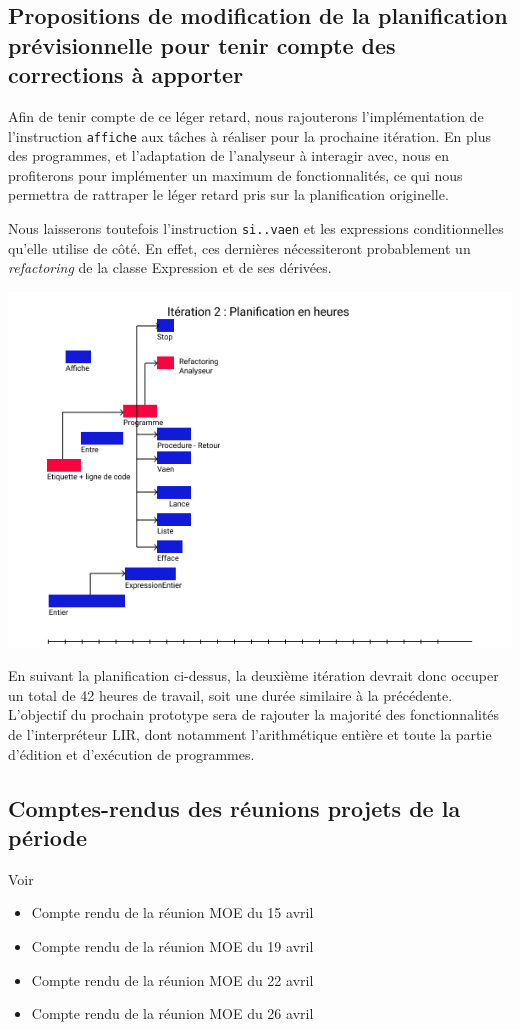 \documentclass[12pt,a4paper,titlepage,openany, oneside]{report}
\begin{document}
    \subsection{Propositions de modification de la planification prévisionnelle pour tenir compte des corrections à apporter}
        Afin de tenir compte de ce léger retard, nous rajouterons l'implémentation de
        l'instruction \verb|affiche| aux tâches à réaliser pour la prochaine itération.
        En plus des programmes, et l'adaptation de l'analyseur à interagir avec, nous en
        profiterons pour implémenter un maximum de fonctionnalités, ce qui nous permettra
        de rattraper le léger retard pris sur la planification originelle.

        Nous laisserons toutefois l'instruction \verb|si..vaen| et les expressions
        conditionnelles qu'elle utilise de côté. En effet, ces dernières nécessiteront
        probablement un \emph{refactoring} de la classe Expression et de ses dérivées.

        \includegraphics[scale=0.75]{fichiers/planification/iteration2/iteration2Planif.png}

        En suivant la planification ci-dessus, la deuxième itération devrait donc occuper
        un total de 42 heures de travail, soit une durée similaire à la précédente.
        L'objectif du prochain prototype sera de rajouter la majorité des fonctionnalités
        de l'interpréteur LIR, dont notamment l'arithmétique entière et toute la partie
        d'édition et d'exécution de programmes.

    \subsection{Comptes-rendus des réunions projets de la période}
       Voir
       \begin{itemize}
           \item Compte rendu de la réunion MOE du 15 avril
           \item Compte rendu de la réunion MOE du 19 avril
           \item Compte rendu de la réunion MOE du 22 avril
           \item Compte rendu de la réunion MOE du 26 avril
       \end{itemize}
\end{document}
